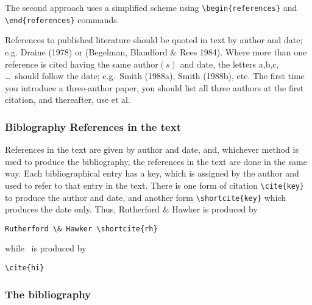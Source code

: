 The second approach uses a simplified scheme using \verb"\begin{references}" and
\verb"\end{references}" commands.

References to published literature should be quoted in text by author and date;
e.g. Draine (1978) or (Begelman, Blandford \& Rees 1984). Where more than one
reference is cited having the same author$(s)$ and date, the letters a,b,c,
\ldots\ should follow the date; e.g.\ Smith (1988a), Smith (1988b), etc. The
first time you introduce a three-author paper, you should list all three authors
at the first citation, and thereafter, use et al.

\subsubsection{Biblography References in the text}

References in the text are given by author and date, and, whichever method is
used to produce the bibliography, the references in the text are done in the
same way. Each bibliographical entry has a key, which is assigned by the author
and used to refer to that entry in the text. There is one form of citation
\textendash{} \verb"\cite{key}" \textendash{} to produce the author and date,
and another form \textendash{} \verb"\shortcite{key}" \textendash{} which
produces the date only. Thus, Rutherford \& Hawker  is produced by
\begin{verbatim}
Rutherford \& Hawker \shortcite{rh}
\end{verbatim}
while~\cite{hi} is produced by
\begin{verbatim}
\cite{hi}
\end{verbatim}

\subsubsection{The bibliography}

